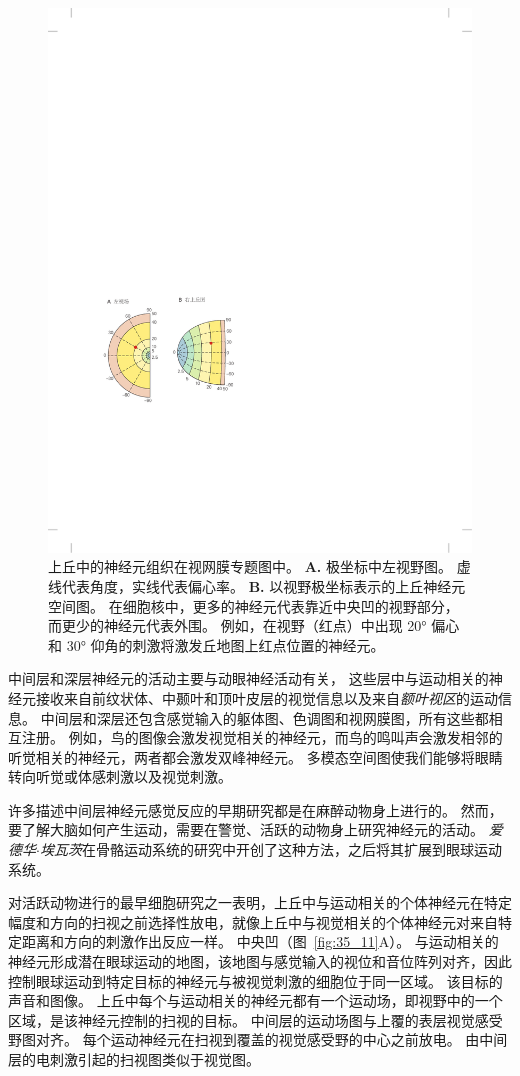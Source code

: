 \begin{figure}[htbp]
	\centering
	\includegraphics[width=0.53\linewidth]{chap35/fig_35_10}
	\caption{上丘中的神经元组织在视网膜专题图中。
		\textbf{A.} 极坐标中左视野图。
		虚线代表角度，实线代表偏心率。
		\textbf{B.} 以视野极坐标表示的上丘神经元空间图。
		在细胞核中，更多的神经元代表靠近中央凹的视野部分，而更少的神经元代表外围。
		例如，在视野（红点）中出现 20° 偏心和 30° 仰角的刺激将激发丘地图上红点位置的神经元\cite{aizawa1998reversible}。}
	\label{fig:35_10}
\end{figure}


中间层和深层神经元的活动主要与动眼神经活动有关，
这些层中与运动相关的神经元接收来自前纹状体、中颞叶和顶叶皮层的视觉信息以及来自\textit{额叶视区}的运动信息。
中间层和深层还包含感觉输入的躯体图、色调图和视网膜图，所有这些都相互注册。
例如，鸟的图像会激发视觉相关的神经元，而鸟的鸣叫声会激发相邻的听觉相关的神经元，两者都会激发双峰神经元。
多模态空间图使我们能够将眼睛转向听觉或体感刺激以及视觉刺激。


许多描述中间层神经元感觉反应的早期研究都是在麻醉动物身上进行的。
然而，要了解大脑如何产生运动，需要在警觉、活跃的动物身上研究神经元的活动。
\textit{爱德华$\cdot$埃瓦茨}在骨骼运动系统的研究中开创了这种方法，之后将其扩展到眼球运动系统。


对活跃动物进行的最早细胞研究之一表明，上丘中与运动相关的个体神经元在特定幅度和方向的扫视之前选择性放电，就像上丘中与视觉相关的个体神经元对来自特定距离和方向的刺激作出反应一样。
中央凹（图~\ref{fig:35_11}A）。
与运动相关的神经元形成潜在眼球运动的地图，该地图与感觉输入的视位和音位阵列对齐，因此控制眼球运动到特定目标的神经元与被视觉刺激的细胞位于同一区域。
该目标的声音和图像。
上丘中每个与运动相关的神经元都有一个运动场，即视野中的一个区域，是该神经元控制的扫视的目标。
中间层的运动场图与上覆的表层视觉感受野图对齐。
每个运动神经元在扫视到覆盖的视觉感受野的中心之前放电。
由中间层的电刺激引起的扫视图类似于视觉图。


